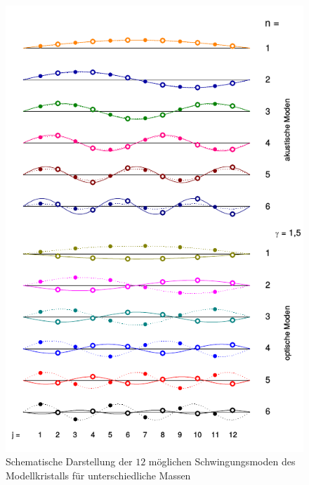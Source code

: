 \begin{figure}[tb]
  \centering
  \includegraphics[scale=1.0]{./fig/moden2.png}
  \caption{Schematische Darstellung der $12$ möglichen Schwingungsmoden des Modellkristalls für unterschiedliche Massen \cite{Litmap}}
  \label{fig:moden2}
\end{figure}

